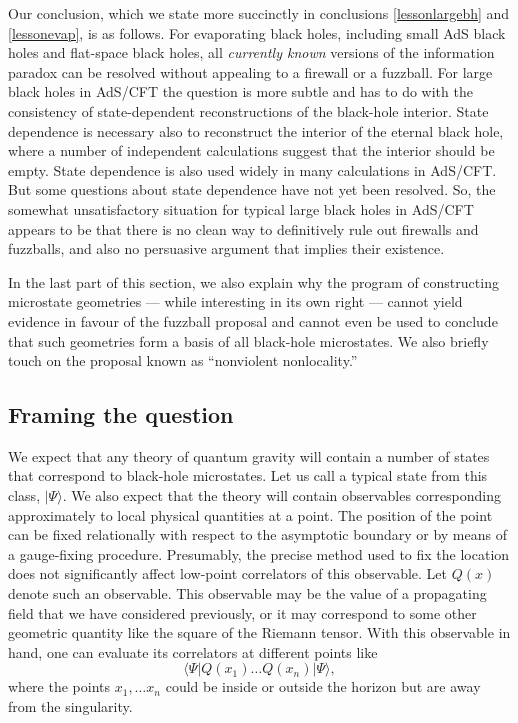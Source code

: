 \documentclass[12pt]{article}
\def\qop{Q}
\begin{document}
Our conclusion, which we state more succinctly in conclusions \ref{lessonlargebh} and \ref{lessonevap}, is as follows. For evaporating black holes, including small AdS black holes and flat-space black holes, all {\em currently known} versions of the information paradox can be resolved without appealing to a firewall or a fuzzball. For large black holes in AdS/CFT  the question  is more subtle and has to do with the consistency of state-dependent reconstructions of the black-hole interior.  State dependence is necessary also to reconstruct the interior of the eternal black hole, where a number of independent calculations suggest that the interior should be empty. State dependence is also used widely in many calculations in AdS/CFT. But some questions about state dependence have not yet been resolved. So, the somewhat unsatisfactory situation for typical large black holes in AdS/CFT appears to be that there is no clean way to definitively rule out firewalls and fuzzballs, and also no persuasive argument that implies their existence.

In the last part of this section, we also explain why the program of constructing  microstate geometries --- while interesting in its own right --- cannot yield evidence in favour of the fuzzball proposal and cannot even be used to conclude that such geometries  form a basis of all black-hole microstates. We also briefly touch on the proposal known as ``nonviolent nonlocality.''






\subsection{Framing the question}

We expect that any theory of quantum gravity will contain a number of states that correspond to black-hole microstates. Let us call a typical state from this class, $|\Psi \rangle$. We also expect that the theory will contain 
observables corresponding approximately to local physical quantities at a point.  The position of the point can be fixed relationally with respect to the asymptotic boundary or by means of a gauge-fixing procedure. Presumably, the precise method used to fix the location does not significantly  affect low-point correlators of this observable. Let $\qop(x)$ denote such an observable. This observable may be the value of a propagating field that we have considered previously, or it may correspond to some other geometric quantity like the square of the Riemann tensor. With this observable in hand, one can evaluate its correlators  at different points like
\[
\langle \Psi |  \qop(x_1) \ldots \qop(x_n) |\Psi \rangle,
\]
where the points $x_1, \ldots x_n$ could be inside or outside the horizon but are away from the singularity.
\end{document}

